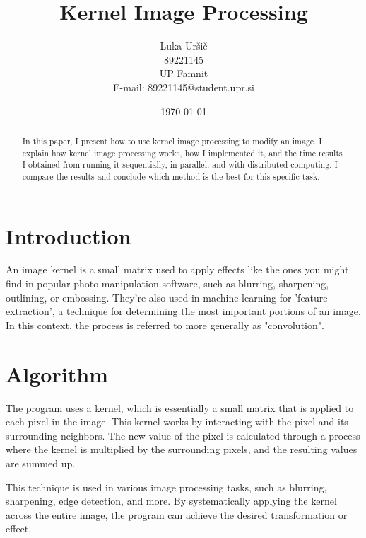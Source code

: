\documentclass{article}
\title{Kernel Image Processing}
\author{Luka Uršič \\ 89221145 \\ UP Famnit \\ E-mail: 89221145@student.upr.si}
\date{\today}
\begin{document}
\maketitle
\thispagestyle{empty}

\begin{abstract}
    In this paper, I present how to use kernel image processing to modify an image. I explain how kernel image processing works, how I implemented it, and the time results I obtained from running it sequentially, in parallel, and with distributed computing. I compare the results and conclude which method is the best for this specific task.
\end{abstract}

\begin{multicols}{2}

    \section{Introduction}
    An image kernel is a small matrix used to apply effects like the ones you might find in popular photo manipulation software, such as blurring, sharpening, outlining, or embossing. They're also used in machine learning for 'feature extraction', a technique for determining the most important portions of an image. In this context, the process is referred to more generally as "convolution".

    \cite{setosa}

    \section{Algorithm}

    The program uses a kernel, which is essentially a small matrix that is applied to each pixel in the image. This kernel works by interacting with the pixel and its surrounding neighbors. The new value of the pixel is calculated through a process where the kernel is multiplied by the surrounding pixels, and the resulting values are summed up.

    This technique is used in various image processing tasks, such as blurring, sharpening, edge detection, and more. By systematically applying the kernel across the entire image, the program can achieve the desired transformation or effect.

    \cite{wikipedia}


\end{multicols}
\end{document}
